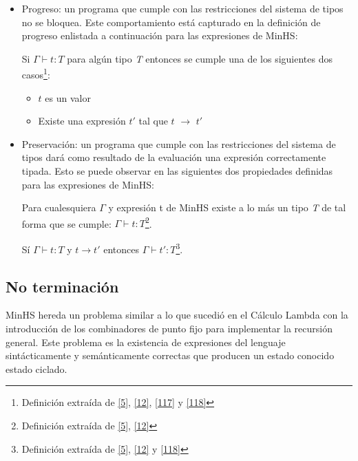         \begin{itemize}
            \item Progreso: un programa que cumple con las restricciones del sistema de tipos no se bloquea. Este comportamiento está capturado en la definición de progreso enlistada a continuación para las expresiones de \textsf{MinHS}:
             
             \begin{definition}
                Si $\Gamma \vdash t : \textit{T}$ para algún tipo \textit{T} entonces se cumple una de los siguientes dos casos\footnote{Definición extraída de  \hyperlink{5}{[5]},  \hyperlink{12}{[12]}, \hyperlink{117}{[117]} y  \hyperlink{118}{[118]}}:
                \begin{itemize}
			\item $t$ es un valor 
                	\item Existe una expresión $t'$ tal que $t$ $\to$ $t'$
		   \end{itemize}
             \end{definition}

\bigskip
            \item Preservación: un programa que cumple con las restricciones del sistema de tipos dará como resultado de la evaluación una expresión correctamente tipada. Esto se puede observar en las siguientes dos propiedades definidas para las expresiones de \textsf{MinHS}:
                
                    \begin{definition}
                        Para cualesquiera $\Gamma$ y expresión t de \textsf{MinHS} existe a lo más un tipo \textit{T} de tal forma que se cumple: $\Gamma \vdash t : \textit{T}$\footnote{Definición extraída de \hyperlink{5}{[5]},  \hyperlink{12}{[12]}}.
                    \end{definition}
                    
                     \begin{definition}
                        Sí $\Gamma \vdash t : \textit{T}$ y $t \to t'$ entonces $\Gamma \vdash t' : \textit{T}$\footnote{Definición extraída de  \hyperlink{5}{[5]},  \hyperlink{12}{[12]}  y \hyperlink{118}{[118]}}.
                    \end{definition}

        \end{itemize}

    \subsection{No terminación}
        \textsf{MinHS} hereda un problema similar a lo que sucedió en el Cálculo Lambda con la introducción de los combinadores de punto fijo para implementar la recursión general. Este problema es la existencia de expresiones del lenguaje sintácticamente y semánticamente correctas que producen un estado conocido estado ciclado.

